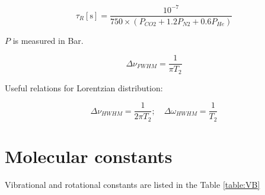 \documentclass{report}
\begin{document}
\begin{equation}\label{eq:tauR}
\tau _R[\text{s}] = \frac{10^{-7}}{750 \times (P_{CO2}+1.2P_{N2}+0.6P_{He})}
\end{equation}

$P$ is measured in Bar.

\begin{equation*}
\Delta\nu _{FWHM} = \frac{1}{\pi T_2}
\end{equation*}

Useful relations for Lorentzian distribution:

\begin{equation*}
\Delta\nu _{HWHM} = \frac{1}{2\pi T_2};\quad \Delta\omega _{HWHM} = \frac{1}{T_2}
\end{equation*}


\section{Molecular constants}

Vibrational and rotational constants are listed in the Table \ref{table:VB}
\end{document}
